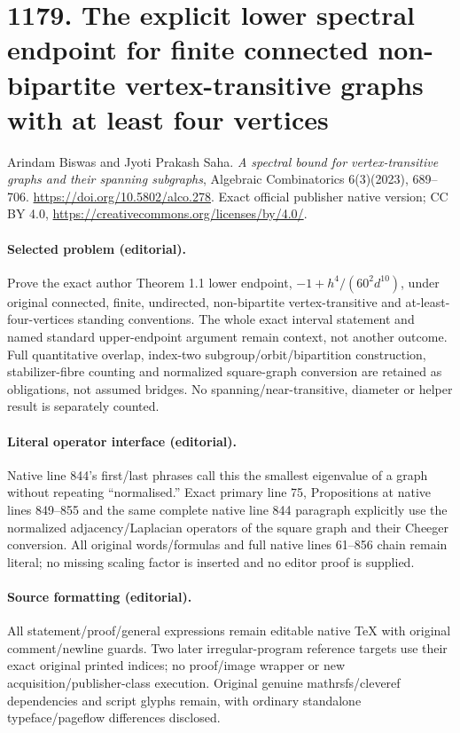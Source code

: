 \documentclass[10pt]{article}
\theoremstyle{definition}
\begin{document}
\section*{1179. The explicit lower spectral endpoint for finite connected non-bipartite vertex-transitive graphs with at least four vertices}
Arindam Biswas and Jyoti Prakash Saha. \emph{A spectral bound for vertex-transitive graphs and their spanning subgraphs}, Algebraic Combinatorics 6(3)(2023), 689--706. \url{https://doi.org/10.5802/alco.278}. Exact official publisher native version; CC BY 4.0, \url{https://creativecommons.org/licenses/by/4.0/}.\par
\paragraph{Selected problem (editorial).} Prove the exact author Theorem 1.1 lower endpoint, \(-1+h^4/(60^2d^{10})\), under original connected, finite, undirected, non-bipartite vertex-transitive and at-least-four-vertices standing conventions. The whole exact interval statement and named standard upper-endpoint argument remain context, not another outcome. Full quantitative overlap, index-two subgroup/orbit/bipartition construction, stabilizer-fibre counting and normalized square-graph conversion are retained as obligations, not assumed bridges. No spanning/near-transitive, diameter or helper result is separately counted.
\paragraph{Literal operator interface (editorial).} Native line 844's first/last phrases call this the smallest eigenvalue of a graph without repeating ``normalised.'' Exact primary line 75, Propositions at native lines 849--855 and the same complete native line 844 paragraph explicitly use the normalized adjacency/Laplacian operators of the square graph and their Cheeger conversion. All original words/formulas and full native lines 61--856 chain remain literal; no missing scaling factor is inserted and no editor proof is supplied.
\paragraph{Source formatting (editorial).} All statement/proof/general expressions remain editable native TeX with original comment/newline guards. Two later irregular-program reference targets use their exact original printed indices; no proof/image wrapper or new acquisition/publisher-class execution. Original genuine mathrsfs/cleveref dependencies and script glyphs remain, with ordinary standalone typeface/pageflow differences disclosed.
\clearpage
\end{document}
